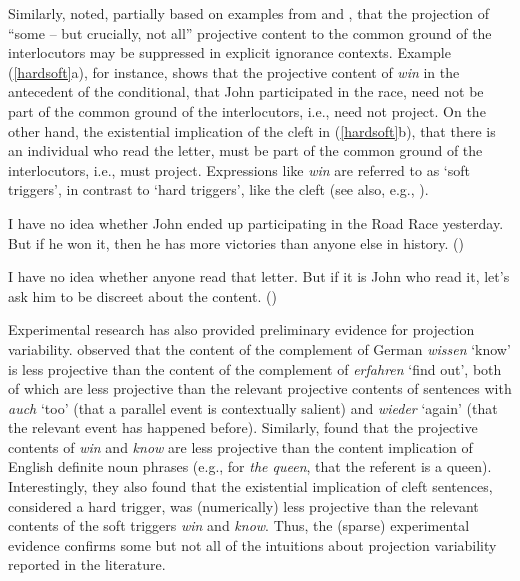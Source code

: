 \documentclass[11pt,fleqn]{article}
\newcommand{\6}{\mbox{$[\hspace*{-.6mm}[$}}
\newcommand{\9}{\mbox{$]\hspace*{-.6mm}]$}}
\def\infelic{{\leavevmode\llap{\#}}}
\begin{document}
Similarly, \citet[432]{simons01} noted, partially based on examples from \citealt{ccmg90} and \citealt{geurts94}, that the projection of ``some -- but crucially, not all'' projective content to the common ground of the interlocutors may be suppressed in explicit ignorance contexts. Example (\ref{hardsoft}a), for instance, shows that the projective content of {\em win} in the antecedent of the conditional, that John participated in the race, need not be part of the common ground of the interlocutors, i.e., need not project. On the other hand, the existential implication of the cleft in (\ref{hardsoft}b), that there is an individual who read the letter, must be part of the common ground of the interlocutors, i.e., must project. Expressions like {\em win} are referred to as `soft triggers', in contrast to `hard triggers', like the cleft (see also, e.g., \citealt{abusch10}).

\begin{exe}
\ex\label{hardsoft}
\begin{xlist}

\ex I have no idea whether John ended up participating in the Road Race yesterday. But if he won it, then he has more victories than anyone else in history. \hfill (\citealt[39]{abusch10})

\ex\infelic I have no idea whether anyone read that letter. But if it is John
who read it, let's ask him to be discreet about the content. \hfill (\citealt[40]{abusch10})

\end{xlist}
\end{exe}

Experimental research has also provided preliminary evidence for projection variability. \citet{xue-onea11} observed that the content of the complement of German {\em wissen} `know' is less projective than the content of the complement of {\em erfahren} `find out', both of which are less projective than the relevant projective contents of sentences with {\em auch} `too' (that a parallel event is contextually salient) and {\em wieder} `again' (that the relevant event has happened before). Similarly, \citet{smith-hall11} found that the projective contents of {\em win} and {\em know} are less projective than the content implication of English definite noun phrases (e.g., for {\em the queen}, that the referent is a queen). Interestingly, they also found that the existential implication of cleft sentences, considered a hard trigger, was (numerically) less projective than the relevant contents of the soft triggers {\em win} and {\em know}. Thus, the (sparse) experimental evidence confirms some but not all of the intuitions about projection variability reported in the literature.
\end{document}
